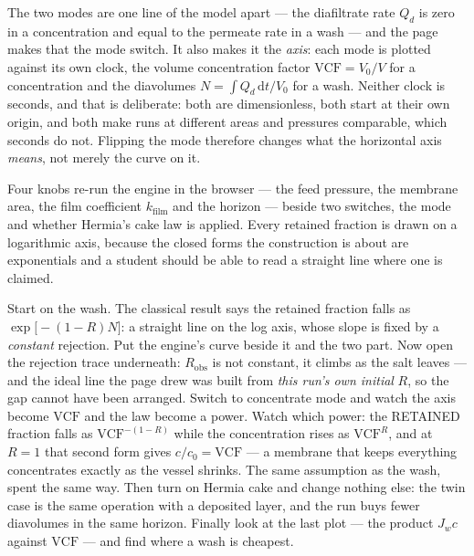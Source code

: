 \documentclass[11pt,a4paper]{article}
\begin{document}
The two modes are one line of the model apart --- the diafiltrate rate
$Q_d$ is zero in a concentration and equal to the permeate rate in a wash
--- and the page makes that the mode switch.  It also makes it the
\emph{axis}: each mode is plotted against its own clock, the volume
concentration factor $\mathrm{VCF} = V_0/V$ for a concentration and the
diavolumes $N = \int Q_d\,\mathrm{d}t / V_0$ for a wash.  Neither clock is
seconds, and that is deliberate: both are dimensionless, both start at
their own origin, and both make runs at different areas and pressures
comparable, which seconds do not.  Flipping the mode therefore changes
what the horizontal axis \emph{means}, not merely the curve on it.

Four knobs re-run the engine in the browser --- the feed pressure, the
membrane area, the film coefficient $k_{\mathrm{film}}$ and the horizon
--- beside two switches, the mode and whether Hermia's cake law is
applied.  Every retained fraction is drawn on a logarithmic axis, because
the closed forms the construction is about are exponentials and a student
should be able to read a straight line where one is claimed.

\begin{tryit}
Start on the wash.  The classical result says the retained fraction falls
as $\exp\!\big[-(1-R)N\big]$: a straight line on the log axis, whose
slope is fixed by a \emph{constant} rejection.  Put the engine's curve
beside it and the two part.  Now open the rejection trace underneath:
$R_{\mathrm{obs}}$ is not constant, it climbs as the salt leaves --- and
the ideal line the page drew was built from \emph{this run's own initial}
$R$, so the gap cannot have been arranged.  Switch to concentrate mode
and watch the axis become $\mathrm{VCF}$ and the law become a power.  Watch which power: the RETAINED
fraction falls as $\mathrm{VCF}^{-(1-R)}$ while the concentration rises as
$\mathrm{VCF}^{R}$, and at $R=1$ that second form gives
$c/c_0=\mathrm{VCF}$ --- a membrane that keeps everything concentrates
exactly as the vessel shrinks.  The same assumption as the wash, spent
the same way.  Then turn
on Hermia cake and change nothing else: the twin case is the same
operation with a deposited layer, and the run buys fewer diavolumes in
the same horizon.  Finally look at the last plot --- the product
$J_w c$ against $\mathrm{VCF}$ --- and find where a wash is cheapest.
\end{tryit}
\end{document}
